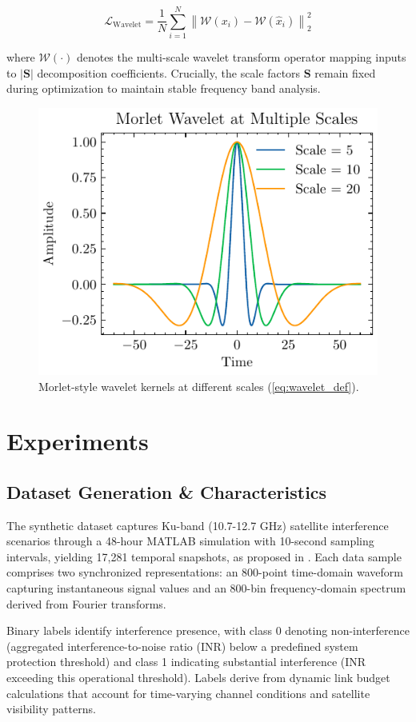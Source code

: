 \documentclass[10pt,twocolumn]{article}
\begin{document}
\begin{equation}
    \mathcal{L}_{\text{Wavelet}} = \frac{1}{N}\sum_{i=1}^{N} \left\lVert \mathcal{W}(x_i) - \mathcal{W}(\hat{x}_i) \right\rVert_2^2
    \label{eq:wavelet_loss}
\end{equation}

where $\mathcal{W}(\cdot)$ denotes the multi-scale wavelet transform operator mapping inputs to $|\mathbf{S}|$ decomposition coefficients. Crucially, the scale factors $\mathbf{S}$ remain fixed during optimization to maintain stable frequency band analysis.



\begin{figure}[htbp]
    \centering
    \includegraphics[width=0.5\linewidth]{wavelet-scales.pdf}
    \caption{Morlet-style wavelet kernels at different scales (\autoref{eq:wavelet_def}).}
    \label{fig:wavelet_scales}
\end{figure}

\section{Experiments}
\subsection{Dataset Generation \& Characteristics}
\label{sec:dataset}

The synthetic dataset captures Ku-band (10.7-12.7 GHz) satellite interference scenarios through a 48-hour MATLAB simulation with 10-second sampling intervals, yielding 17,281 temporal snapshots, as proposed in \cite{saifaldawlaGenAIBasedModelsNGSO2024}. Each data sample comprises two synchronized representations: an 800-point time-domain waveform capturing instantaneous signal values and an 800-bin frequency-domain spectrum derived from Fourier transforms.

Binary labels identify interference presence, with class 0 denoting non-interference (aggregated interference-to-noise ratio (INR) below a predefined system protection threshold) and class 1 indicating substantial interference (INR exceeding this operational threshold). Labels derive from dynamic link budget calculations that account for time-varying channel conditions and satellite visibility patterns.
\end{document}
